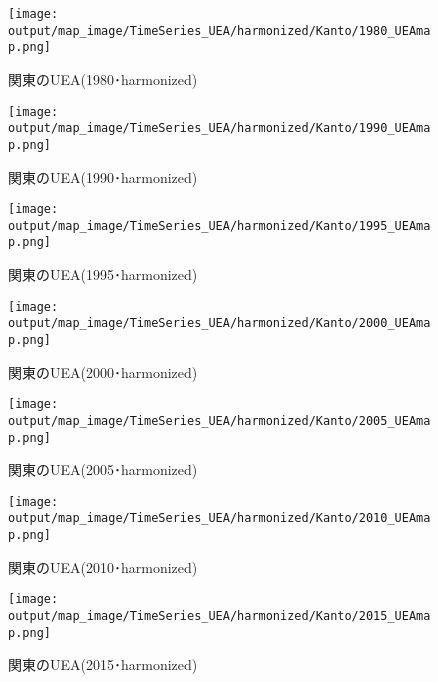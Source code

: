 \documentclass{ltjsarticle}
\begin{document}
\begin{figure}[pbth]
  \centering
  \texttt{[image: output/map\_image/TimeSeries\_UEA/harmonized/Kanto/1980\_UEAmap.png]}
  \caption{\label{ham:1980UEA:kan}関東のUEA(1980･harmonized)}
\end{figure}
\begin{figure}[pbth]
  \centering
  \texttt{[image: output/map\_image/TimeSeries\_UEA/harmonized/Kanto/1990\_UEAmap.png]}
  \caption{\label{ham:1990UEA:kan}関東のUEA(1990･harmonized)}
\end{figure}
\begin{figure}[pbth]
  \centering
  \texttt{[image: output/map\_image/TimeSeries\_UEA/harmonized/Kanto/1995\_UEAmap.png]}
  \caption{\label{ham:1995UEA:kan}関東のUEA(1995･harmonized)}
\end{figure}
\begin{figure}[pbth]
  \centering
  \texttt{[image: output/map\_image/TimeSeries\_UEA/harmonized/Kanto/2000\_UEAmap.png]}
  \caption{\label{ham:2000UEA:kan}関東のUEA(2000･harmonized)}
\end{figure}
\begin{figure}[pbth]
  \centering
  \texttt{[image: output/map\_image/TimeSeries\_UEA/harmonized/Kanto/2005\_UEAmap.png]}
  \caption{\label{ham:2005UEA:kan}関東のUEA(2005･harmonized)}
\end{figure}
\begin{figure}[pbth]
  \centering
  \texttt{[image: output/map\_image/TimeSeries\_UEA/harmonized/Kanto/2010\_UEAmap.png]}
  \caption{\label{ham:2010UEA:kan}関東のUEA(2010･harmonized)}
\end{figure}
\begin{figure}[pbth]
  \centering
  \texttt{[image: output/map\_image/TimeSeries\_UEA/harmonized/Kanto/2015\_UEAmap.png]}
  \caption{\label{ham:2015UEA:kan}関東のUEA(2015･harmonized)}
\end{figure}



\clearpage
\end{document}
